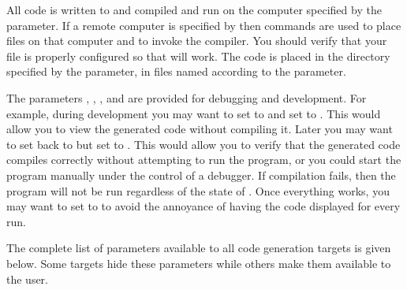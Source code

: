 All code is written to and compiled and run on the computer specified
by the  parameter.
If a remote
computer is specified by  then  commands are used
to place files on that computer and to invoke the compiler.  You should
verify that your  file is properly configured so that
 will work.  The code is placed in the directory specified by
the 
parameter, in files
named according to the 
parameter.

The parameters , , , and 
are provided for debugging and development.  For example, during
development you may want to set  to  and set
 to .  This would allow you to view the
generated code without compiling it.  Later you may want to set
 back to  but set  to .
This would allow you to verify that the generated code compiles
correctly without attempting to run the program, or you could start the
program manually under the control of a debugger.  If compilation
fails, then the program will not be run regardless of the state of
.  Once everything works, you may want to set 
to  to avoid the annoyance of having the code displayed for
every run.

The complete list of parameters available to all code generation
targets is given below.  Some targets hide these parameters while
others make them available to the user.

